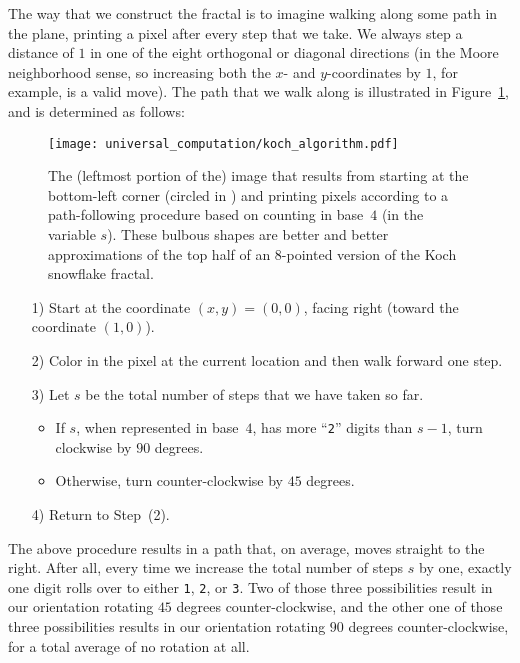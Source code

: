 The way that we construct the fractal is to imagine walking along some path in the plane, printing a pixel after every step that we take. We always step a distance of $1$ in one of the eight orthogonal or diagonal directions (in the Moore neighborhood  sense, so increasing both the $x$- and $y$-coordinates by $1$, for example, is a valid move). The path that we walk along is illustrated in Figure~\ref{fig:koch_algorithm}, and is determined as follows:\smallskip

\begin{figure}[!htb]
	\centering
	\texttt{[image: universal\_computation/koch\_algorithm.pdf]}
	\caption{The (leftmost portion of the) image that results from starting at the bottom-left corner (circled in ) and printing pixels according to a path-following procedure based on counting in base~$4$ (in the variable $s$). These bulbous shapes are better and better approximations of the top half of an 8-pointed version of the Koch snowflake fractal.}\label{fig:koch_algorithm}
\end{figure}

\begin{itemize}
	\item[1)] Start at the coordinate $(x,y) = (0,0)$, facing right (toward the coordinate $(1,0)$).\smallskip
	
	\item[2)] Color in the pixel at the current location and then walk forward one step.\smallskip
	
	\item[3)] Let $s$ be the total number of steps that we have taken so far.\smallskip
	\begin{itemize}
		\item If $s$, when represented in base~$4$, has more ``\texttt{2}'' digits than $s-1$, turn clockwise by $90$ degrees.\smallskip
		
		\item Otherwise, turn counter-clockwise by $45$ degrees.\smallskip
	\end{itemize}
	
	\item[4)] Return to Step~(2).\smallskip
\end{itemize}

The above procedure results in a path that, on average, moves straight to the right. After all, every time we increase the total number of steps $s$ by one, exactly one digit rolls over to either \texttt{1}, \texttt{2}, or \texttt{3}. Two of those three possibilities result in our orientation rotating $45$ degrees counter-clockwise, and the other one of those three possibilities results in our orientation rotating $90$ degrees counter-clockwise, for a total average of no rotation at all.

